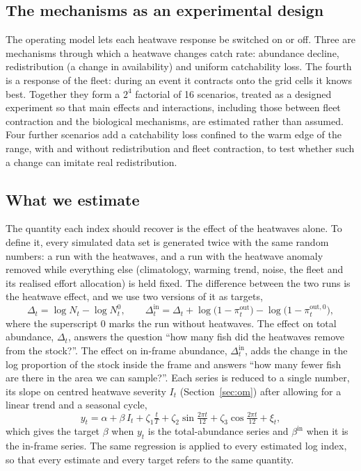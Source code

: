 \documentclass[11pt,a4paper]{article}
\newcommand{\vt}[1]{\text{#1}}
\begin{document}
\subsection{The mechanisms as an experimental design}
\label{sec:design}

The operating model lets each heatwave response be switched on or off. Three are mechanisms through which a heatwave changes catch rate: abundance decline, redistribution (a change in availability) and uniform catchability loss. The fourth is a response of the fleet: during an event it contracts onto the grid cells it knows best. Together they form a $2^4$ factorial of 16 scenarios, treated as a designed experiment so that main effects and interactions, including those between fleet contraction and the biological mechanisms, are estimated rather than assumed. Four further scenarios add a catchability loss confined to the warm edge of the range, with and without redistribution and fleet contraction, to test whether such a change can imitate real redistribution.

\subsection{What we estimate}
\label{sec:targets}

The quantity each index should recover is the effect of the heatwaves alone. To define it, every simulated data set is generated twice with the same random numbers: a run with the heatwaves, and a run with the heatwave anomaly removed while everything else (climatology, warming trend, noise, the fleet and its realised effort allocation) is held fixed. The difference between the two runs is the heatwave effect, and we use two versions of it as targets,
\begin{equation}
\Delta_t = \log N_t - \log N^0_t, \qquad \Delta^{\vt{in}}_t = \Delta_t + \log\big(1-\pi^{\vt{out}}_t\big) - \log\big(1-\pi^{\vt{out},0}_t\big),
\label{eq:targets}
\end{equation}
where the superscript $0$ marks the run without heatwaves. The effect on total abundance, $\Delta_t$, answers the question ``how many fish did the heatwaves remove from the stock?''. The effect on in-frame abundance, $\Delta^{\vt{in}}_t$, adds the change in the log proportion of the stock inside the frame and answers ``how many fewer fish are there in the area we can sample?''. Each series is reduced to a single number, its slope on centred heatwave severity $I_t$ (Section~\ref{sec:om}) after allowing for a linear trend and a seasonal cycle,
\begin{equation}
y_t = \alpha + \beta\, I_t + \zeta_1 \tfrac{t}{T} + \zeta_2 \sin\tfrac{2\pi t}{12} + \zeta_3 \cos\tfrac{2\pi t}{12} + \xi_t ,
\label{eq:regression}
\end{equation}
which gives the target $\beta$ when $y_t$ is the total-abundance series and $\beta^{\vt{in}}$ when it is the in-frame series. The same regression is applied to every estimated log index, so that every estimate and every target refers to the same quantity.
\end{document}
